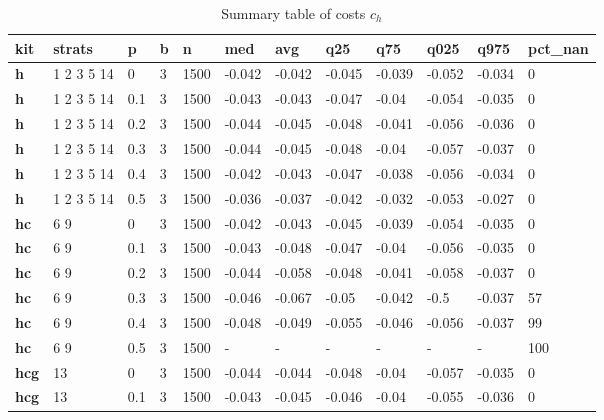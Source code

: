 \begin{longtable}[h]{|p{0.8cm}|p{1.5cm}|p{1cm}|p{1cm}|p{1cm}|p{1cm}|p{1cm}|p{1cm}|p{1cm}|p{1cm}|p{1cm}|p{1.5cm}|}
\caption{Summary table of costs $c_h$}
\label{tab:costs_mod_h} \\
      \hline
\textbf{ kit} & \textbf{ strats} & \textbf{ p} & \textbf{ b} & \textbf{ n} & \textbf{ med} & \textbf{ avg} & \textbf{ q25} & \textbf{ q75} & \textbf{ q025} & \textbf{ q975} & \textbf{ pct\_nan}
    \\ \hline
  \textbf{h   } &  1 2 3 5 14 &   0 & 3 & 1500 & -0.042 & -0.042 & -0.045 & -0.039 & -0.052 & -0.034 &   0
    \\ \hline
  \textbf{h   } &  1 2 3 5 14 & 0.1 & 3 & 1500 & -0.043 & -0.043 & -0.047 &  -0.04 & -0.054 & -0.035 &   0
    \\ \hline
  \textbf{h   } &  1 2 3 5 14 & 0.2 & 3 & 1500 & -0.044 & -0.045 & -0.048 & -0.041 & -0.056 & -0.036 &   0
    \\ \hline
  \textbf{h   } &  1 2 3 5 14 & 0.3 & 3 & 1500 & -0.044 & -0.045 & -0.048 &  -0.04 & -0.057 & -0.037 &   0
    \\ \hline
  \textbf{h   } &  1 2 3 5 14 & 0.4 & 3 & 1500 & -0.042 & -0.043 & -0.047 & -0.038 & -0.056 & -0.034 &   0
    \\ \hline
  \textbf{h   } &  1 2 3 5 14 & 0.5 & 3 & 1500 & -0.036 & -0.037 & -0.042 & -0.032 & -0.053 & -0.027 &   0
    \\ \hline
  \textbf{hc  } &  6 9        &   0 & 3 & 1500 & -0.042 & -0.043 & -0.045 & -0.039 & -0.054 & -0.035 &   0
    \\ \hline
  \textbf{hc  } &  6 9        & 0.1 & 3 & 1500 & -0.043 & -0.048 & -0.047 &  -0.04 & -0.056 & -0.035 &   0
    \\ \hline
  \textbf{hc  } &  6 9        & 0.2 & 3 & 1500 & -0.044 & -0.058 & -0.048 & -0.041 & -0.058 & -0.037 &   0
    \\ \hline
  \textbf{hc  } &  6 9        & 0.3 & 3 & 1500 & -0.046 & -0.067 &  -0.05 & -0.042 &   -0.5 & -0.037 &  57
    \\ \hline
  \textbf{hc  } &  6 9        & 0.4 & 3 & 1500 & -0.048 & -0.049 & -0.055 & -0.046 & -0.056 & -0.037 &  99
    \\ \hline
  \textbf{hc  } &  6 9        & 0.5 & 3 & 1500 & - & - & - & - & - & - & 100
    \\ \hline
  \textbf{hcg } &  13         &   0 & 3 & 1500 & -0.044 & -0.044 & -0.048 &  -0.04 & -0.057 & -0.035 &   0
    \\ \hline
  \textbf{hcg } &  13         & 0.1 & 3 & 1500 & -0.043 & -0.045 & -0.046 &  -0.04 & -0.055 & -0.036 &   0

\end{longtable}

